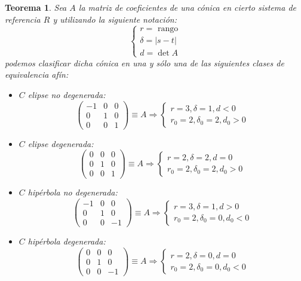 \documentclass[10pt,a4paper,openright]{book}
\theoremstyle{break}
\newtheorem*{theo}{Teorema}
\begin{document}
\begin{theo}
Sea $A$ la matriz de coeficientes de una cónica en cierto sistema de referencia $R$ y utilizando la siguiente notación:
$$\begin{cases} r = \mbox{ rango} \\ \delta = |s-t| \\ d = \det A
\end{cases}$$
podemos clasificar dicha cónica en una y sólo una de las siguientes clases de equivalencia afín:
\begin{itemize}
\item $C$ elipse no degenerada:
$$\left(\begin{array}{c|cc}
-1 & 0 & 0 \\
\hline
0 & 1  & 0  \\
0 &  0 &1
\end{array}
\right) \equiv A \Rightarrow \begin{cases} r= 3 , \delta = 1, d < 0 \\ r_0 = 2, \delta_0 = 2, d_0 >0 \end{cases}$$
\item $C$ elipse degenerada:
$$\left(\begin{array}{c|cc}
0 & 0 & 0 \\
\hline
0 & 1  & 0  \\
0 &  0 &1
\end{array}
\right) \equiv A \Rightarrow \begin{cases} r= 2 , \delta = 2, d = 0 \\ r_0 = 2, \delta_0 = 2, d_0 >0 \end{cases}$$
\item $C$ hipérbola no degenerada:
$$\left(\begin{array}{c|cc}
-1 & 0 & 0 \\
\hline
0 & 1  & 0  \\
0 &  0 & -1
\end{array}
\right) \equiv A \Rightarrow \begin{cases} r= 3 , \delta = 1, d > 0 \\ r_0 = 2, \delta_0 = 0, d_0 < 0 \end{cases}$$
\item $C$ hipérbola degenerada:
$$\left(\begin{array}{c|cc}
0 & 0 & 0 \\
\hline
0 & 1  & 0  \\
0 &  0 & -1
\end{array}
\right) \equiv A \Rightarrow \begin{cases} r= 2 , \delta = 0, d = 0 \\ r_0 = 2, \delta_0 = 0, d_0 < 0 \end{cases}$$

\end{itemize}
\end{theo}
\end{document}
